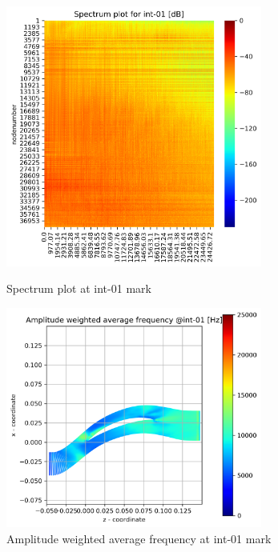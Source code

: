 \begin{figure}[ht]
  \centering
  \includegraphics[width=0.75\textwidth]{Figures/int-01_spectrum.png}
  \caption{Spectrum plot at int-01 mark} \label{int-01-spectrum}
  
  \vspace*{\floatsep}%

  \includegraphics[width=0.75\textwidth]{Figures/int-01-awaf.png}
  \caption{Amplitude weighted average frequency at int-01 mark} \label{int-01-awaf}
\end{figure}

